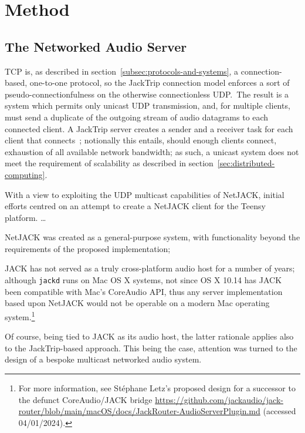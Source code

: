 \section{Method}\label{sec:method}

\subsection{The Networked Audio Server}\label{subsec:the-networked-audio-server}

TCP is, as described in section~\ref{subsec:protocols-and-systems}, a
connection-based, one-to-one protocol, so the JackTrip connection model enforces
a sort of pseudo-connectionfulness on the otherwise connectionless UDP.\
The result is a system which permits only unicast UDP transmission, and, for
multiple clients, must send a duplicate of the outgoing stream of audio
datagrams to each connected client.
A JackTrip server creates a sender and a receiver task for each client that
connects~\citep{caceres_jacktrip_2010};
notionally this entails, should enough clients connect, exhaustion of all
available network bandwidth;
as such, a unicast system does not meet the requirement of scalability as
described in section~\ref{sec:distributed-computing}.

With a view to exploiting the UDP multicast capabilities of NetJACK, initial
efforts centred on an attempt to create a NetJACK client for the Teensy
platform.
\dots
\begin{inparaenum}[1)]
    \item NetJACK was created as a general-purpose system, with functionality
    beyond the requirements of the proposed implementation;
    \item JACK has not served as a truly cross-platform audio host for a
    number of years; although \texttt{jackd} runs on Mac OS X systems, not
    since OS X 10.14 has JACK been compatible with Mac's CoreAudio
    API, thus any server implementation based upon NetJACK would not be
    operable on a modern Mac operating system.\footnote{
        For more information, see Stéphane Letz's proposed design for a
        successor to the defunct CoreAudio/JACK bridge
        \url{https://github.com/jackaudio/jack-router/blob/main/macOS/docs/JackRouter-AudioServerPlugin.md}
        (accessed 04/01/2024).
    }
\end{inparaenum}

Of course, being tied to JACK as its audio host, the latter rationale applies
also to the JackTrip-based approach.
This being the case, attention was turned to the design of a bespoke multicast
networked audio system.

